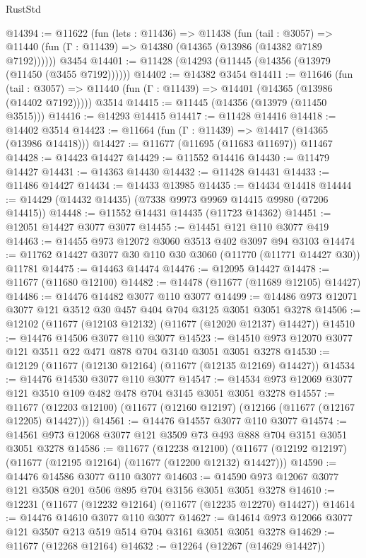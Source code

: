\begin{lexlean}{RustStd}
\begin{coremodule}
@14394 := @11622
    (fun (lets : @11436) =>
    @11438
      (fun (tail : @3057) =>
      @11440 (fun (Γ : @11439) => @14380 (@14365 (@13986 (@14382 @7189 @7192))))))
    @3454
@14401 := @11428 (@14293 (@11445 (@14356 (@13979 (@11450 (@3455 @7192))))))
@14402 := @14382 @3454
@14411 := @11646
    (fun (tail : @3057) => @11440 (fun (Γ : @11439) => @14401 (@14365 (@13986 (@14402 @7192)))))
    @3514
@14415 := @11445 (@14356 (@13979 (@11450 @3515)))
@14416 := @14293 @14415
@14417 := @11428 @14416
@14418 := @14402 @3514
@14423 := @11664 (fun (Γ : @11439) => @14417 (@14365 (@13986 @14418)))
@14427 := @11677 (@11695 (@11683 @11697)) @11467
@14428 := @14423 @14427
@14429 := @11552 @14416
@14430 := @11479 @14427
@14431 := @14363 @14430
@14432 := @11428 @14431
@14433 := @11486 @14427
@14434 := @14433 @13985
@14435 := @14434 @14418
@14444 := @14429 (@14432 @14435) (@7338 @9973 @9969 @14415 @9980 (@7206 @14415))
@14448 := @11552 @14431 @14435 (@11723 @14362)
@14451 := @12051 @14427 @3077 @3077
@14455 := @14451 @121 @110 @3077 @419
@14463 := @14455 @973 @12072 @3060 @3513 @402 @3097 @94 @3103
@14474 := @11762 @14427 @3077 @30 @110 @30 @3060 (@11770 (@11771 @14427 @30)) @11781
@14475 := @14463 @14474
@14476 := @12095 @14427
@14478 := @11677 (@11680 @12100)
@14482 := @14478 (@11677 (@11689 @12105) @14427)
@14486 := @14476 @14482 @3077 @110 @3077
@14499 := @14486 @973 @12071 @3077 @121 @3512 @30 @457 @404 @704 @3125 @3051 @3051 @3278
@14506 := @12102 (@11677 (@12103 @12132) (@11677 (@12020 @12137) @14427))
@14510 := @14476 @14506 @3077 @110 @3077
@14523 := @14510 @973 @12070 @3077 @121 @3511 @22 @471 @878 @704 @3140 @3051 @3051 @3278
@14530 := @12129 (@11677 (@12130 @12164) (@11677 (@12135 @12169) @14427))
@14534 := @14476 @14530 @3077 @110 @3077
@14547 := @14534 @973 @12069 @3077 @121 @3510 @109 @482 @478 @704 @3145 @3051 @3051 @3278
@14557 := @11677 (@12203 @12100) (@11677 (@12160 @12197) (@12166 (@11677 (@12167 @12205) @14427)))
@14561 := @14476 @14557 @3077 @110 @3077
@14574 := @14561 @973 @12068 @3077 @121 @3509 @73 @493 @888 @704 @3151 @3051 @3051 @3278
@14586 := @11677
    (@12238 @12100)
    (@11677 (@12192 @12197) (@11677 (@12195 @12164) (@11677 (@12200 @12132) @14427)))
@14590 := @14476 @14586 @3077 @110 @3077
@14603 := @14590 @973 @12067 @3077 @121 @3508 @201 @506 @895 @704 @3156 @3051 @3051 @3278
@14610 := @12231 (@11677 (@12232 @12164) (@11677 (@12235 @12270) @14427))
@14614 := @14476 @14610 @3077 @110 @3077
@14627 := @14614 @973 @12066 @3077 @121 @3507 @213 @519 @514 @704 @3161 @3051 @3051 @3278
@14629 := @11677 (@12268 @12164)
@14632 := @12264 (@12267 (@14629 @14427))

\end{coremodule}
\end{lexlean}
